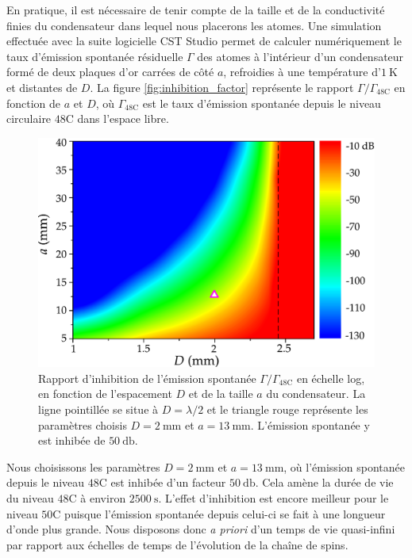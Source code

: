 En pratique, il est nécessaire de tenir compte de la taille et de la conductivité finies du condensateur dans lequel nous placerons les atomes.
Une simulation effectuée avec la suite logicielle CST Studio permet de calculer numériquement le taux d'émission spontanée résiduelle $\Gamma$ des atomes à l'intérieur d'un condensateur formé de deux plaques d'or carrées de côté $a$, refroidies à une température d'$\SI{1}{\K}$ et distantes de $D$.
La figure \eqref{fig:inhibition_factor} représente le rapport $\Gamma/\Gamma_{\mathrm{48C}}$ en fonction de $a$ et $D$, où $\Gamma_{\mathrm{48C}}$ est le taux d'émission spontanée depuis le niveau circulaire $\mathrm{48C}$ dans l'espace libre.
%
\begin{figure}[h]
\centering
\includegraphics[width=.7\linewidth]{figures/circsim/inhibition_factor}
\caption[Inhibition de l'émission spontanée en fonction des dimensions du condensateur]{
Rapport d'inhibition de l'émission spontanée $\Gamma/\Gamma_{\mathrm{48C}}$ en échelle log, en fonction de l'espacement $D$ et de la taille $a$ du condensateur.
La ligne pointillée se situe à $D=\lambda/2$ et le triangle rouge représente les paramètres choisis $D=\SI{2}{\mm}$ et $a=\SI{13}{\mm}$.
L'émission spontanée y est inhibée de $\SI{50}{\decibel}$.
}
\label{fig:inhibition_factor}
\end{figure}
%
Nous choisissons les paramètres $D=\SI{2}{\mm}$ et $a=\SI{13}{\mm}$, où l'émission spontanée depuis le niveau $\mathrm{48C}$ est inhibée d'un facteur $\SI{50}{\decibel}$.
Cela amène la durée de vie du niveau $\mathrm{48C}$ à environ $\SI{2500}{\second}$.
L'effet d'inhibition est encore meilleur pour le niveau $\mathrm{50C}$ puisque l'émission spontanée depuis celui-ci se fait à une longueur d'onde plus grande.
Nous disposons donc \textit{a priori} d'un temps de vie quasi-infini par rapport aux échelles de temps de l'évolution de la chaîne de spins.


